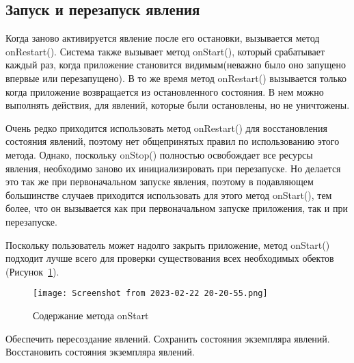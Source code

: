 \subsection{Запуск и перезапуск явления}
Когда заново активируется явление после его остановки, вызывается метод
onRestart(). Система также вызывает метод onStart(), который срабатывает
каждый раз, когда приложение становится видимым(неважно было оно
запущено впервые или перезапущено). В то же время метод onRestart()
вызывается только когда приложение возвращается из остановленного
состояния. В нем можно выполнять действия, для явлений, которые были
остановлены, но не уничтожены.\par
Очень редко приходится использовать метод onRestart() для восстановления
состояния явлений, поэтому нет общепринятых правил по использованию
этого метода. Однако, поскольку onStop() полностью освобождает все
ресурсы явления, необходимо заново их инициализировать при
перезапуске. Но делается это так же при первоначальном запуске явления,
поэтому в подавляющем большинстве случаев приходится использовать для
этого метод onStart(), тем более, что он вызывается как при первоначальном
запуске приложения, так и при перезапуске.\par
Поскольку пользователь может надолго закрыть приложение, метод
onStart() подходит лучше всего для проверки существования всех
необходимых обектов (Рисунок~\ref{fig:activity:onStart:content}).
\begin{figure}[h!tp]
	\centering
	\texttt{[image: Screenshot from 2023-02-22 20-20-55.png]}
	\caption{Содержание метода onStart}
	\label{fig:activity:onStart:content}
\end{figure}


Обеспечить пересоздание явлений. Сохранить
состояния экземпляра явлений. Восстановить
состояния экземпляра явлений.
